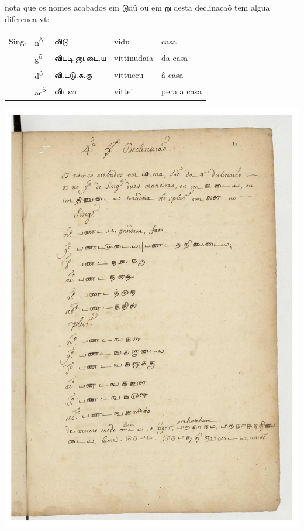 \documentclass[12pt,a4paper]{scrbook}
\begin{document}
      

nota que os nomes acabados em டுdũ ou em று desta declinacaõ tem algua diferenca vt:
        
        
\begin{tabular}{lllll}
    
          
            Sing. &
            n\textsuperscript{õ} &
            விடு &
            vidu &
            casa \\
    
          
    
          
             &
            g\textsuperscript{õ} &
             விடடி.னு.டை.ய &
            vittinudaïa &
            da casa \\
    
          
    
          
             &
            d\textsuperscript{õ} &
             வி.டடு.க.கு &
            vittuccu &
            â casa \\
    
          
    
          
             &
            ac\textsuperscript{õ} &
            விடடை &
            vittei &
            pera a casa \\
    
          
    
          
\end{tabular}
    
          
\newpage
\hypertarget{img-31}{
    \includegraphics[width=\textwidth]{img-31}}
\newpage
          
\end{document}
